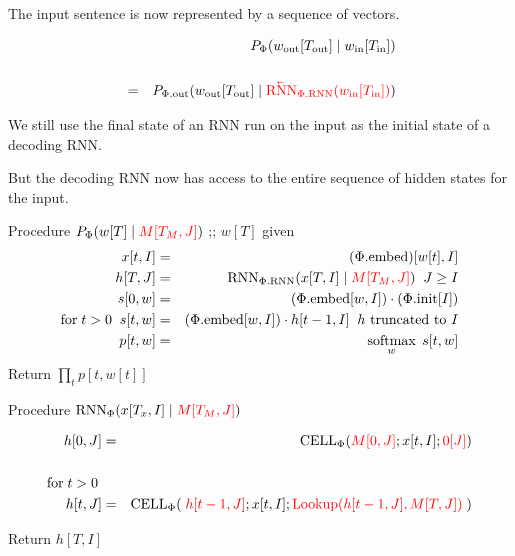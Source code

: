 {The input sentence is now represented by a sequence of vectors.

\vfill
\begin{eqnarray*}
 & & P_\Phi(w_{\mathrm{out}}[T_{\mathrm{out}}] \;|\; w_{\mathrm{in}}[T_{\mathrm{in}}]) \\
 \\
& = & P_{\Phi.\mathrm{out}}(w_{\mathrm{out}}[T_{\mathrm{out}}]\;|\;
{\color{red} \cev{\mathrm{RNN}}_{\Phi.\mathrm{RNN}}(w_{\mathrm{in}}[T_{\mathrm{in}}])})
\end{eqnarray*}

\vfill
We still use the final state of an RNN run on the input as the initial state of a decoding RNN.

\vfill
But the decoding RNN now has access to the entire sequence of hidden states for the input.


Procedure $P_\Phi(w[T] \;|\; {\color{red} M[T_M,J]})$ ;;{\color{red} $w[T]$ given}
{\huge \begin{eqnarray*}
x[t,I] & = & (\Phi.\mathrm{embed})[w[t],I] \\
h[T,J] & = & \mathrm{RNN}_{\Phi.\mathrm{RNN}}(x[T,I] \;|\;{\color{red} M[T_M,J]})\;\;J \geq I \\
s[0,w] & = & (\Phi.\mathrm{embed}[w,I])\cdot (\Phi.\mathrm{init}[I]) \\
\mathrm{for}\;t > 0\;\;s[t,w] & = & (\Phi.\mathrm{embed}[w,I]) \cdot h[t-1,I] \;\;\mbox{$h$ truncated to $I$}\\
p[t,w] & = & \operatorname*{softmax}_w\;s[t,w]
\end{eqnarray*}
}
Return $\prod_t p[t,w[t]]$


Procedure $\mathrm{RNN}_\Phi(x[T_x,I] \;|\; {\color{red} M[T_M,J]})$

\begin{eqnarray*}
h[0,J] & = & \mathrm{CELL}_\Phi({\color{red} M[0,J]};x[t,I];{\color{red} 0[J]}) \\
\\
\mbox{for}\;t > 0\;\\
h[t,J] & = & \mathrm{CELL}_\Phi(\;{\color{red} h[t-1,J]};x[t,I];{\color{red}\mathrm{Lookup}(h[t-1,J],M[T,J])}\;)\\
\end{eqnarray*}

Return $h[T,I]$


}
